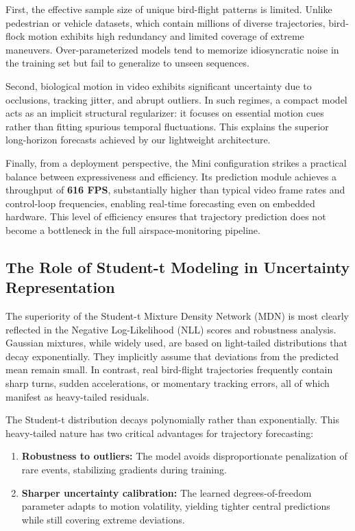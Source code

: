 \documentclass[journal]{IEEEtran}
\begin{document}
First, the effective sample size of unique bird-flight patterns is limited. Unlike pedestrian or vehicle datasets, which contain millions of diverse trajectories, bird-flock motion exhibits high redundancy and limited coverage of extreme maneuvers. Over-parameterized models tend to memorize idiosyncratic noise in the training set but fail to generalize to unseen sequences.

Second, biological motion in video exhibits significant uncertainty due to occlusions, tracking jitter, and abrupt outliers. In such regimes, a compact model acts as an implicit structural regularizer: it focuses on essential motion cues rather than fitting spurious temporal fluctuations. This explains the superior long-horizon forecasts achieved by our lightweight architecture.

Finally, from a deployment perspective, the Mini configuration strikes a practical balance between expressiveness and efficiency. Its prediction module achieves a throughput of \textbf{616 FPS}, substantially higher than typical video frame rates and control-loop frequencies, enabling real-time forecasting even on embedded hardware. This level of efficiency ensures that trajectory prediction does not become a bottleneck in the full airspace-monitoring pipeline.

\subsection{The Role of Student-t Modeling in Uncertainty Representation}

The superiority of the Student-t Mixture Density Network (MDN) is most clearly reflected in the Negative Log-Likelihood (NLL) scores and robustness analysis. Gaussian mixtures, while widely used, are based on light-tailed distributions that decay exponentially. They implicitly assume that deviations from the predicted mean remain small. In contrast, real bird-flight trajectories frequently contain sharp turns, sudden accelerations, or momentary tracking errors, all of which manifest as heavy-tailed residuals.

The Student-t distribution decays polynomially rather than exponentially. This heavy-tailed nature has two critical advantages for trajectory forecasting:
\begin{enumerate}
	\item \textbf{Robustness to outliers:} The model avoids disproportionate penalization of rare events, stabilizing gradients during training.
	\item \textbf{Sharper uncertainty calibration:} The learned degrees-of-freedom parameter adapts to motion volatility, yielding tighter central predictions while still covering extreme deviations.
\end{enumerate}
\end{document}
